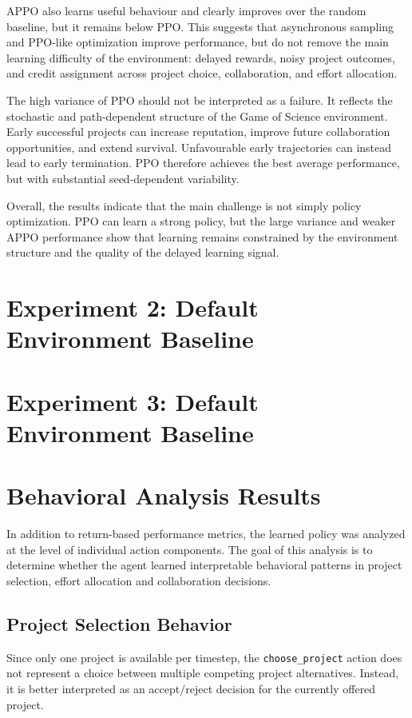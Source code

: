 \documentclass[english,bachelor]{hsluthesis}
\begin{document}
APPO also learns useful behaviour and clearly improves over the random baseline, but it remains below PPO. This suggests that asynchronous sampling and PPO-like optimization improve performance, but do not remove the main learning difficulty of the environment: delayed rewards, noisy project outcomes, and credit assignment across project choice, collaboration, and effort allocation.

The high variance of PPO should not be interpreted as a failure. It reflects the stochastic and path-dependent structure of the Game of Science environment. Early successful projects can increase reputation, improve future collaboration opportunities, and extend survival. Unfavourable early trajectories can instead lead to early termination. PPO therefore achieves the best average performance, but with substantial seed-dependent variability.

Overall, the results indicate that the main challenge is not simply policy optimization. PPO can learn a strong policy, but the large variance and weaker APPO performance show that learning remains constrained by the environment structure and the quality of the delayed learning signal.

\section{Experiment 2: Default Environment Baseline}

\section{Experiment 3: Default Environment Baseline}

\section{Behavioral Analysis Results}

In addition to return-based performance metrics, the learned policy was analyzed at the level of individual action components. The goal of this analysis is to determine whether the agent learned interpretable behavioral patterns in project selection, effort allocation and collaboration decisions.

\subsection{Project Selection Behavior}

Since only one project is available per timestep, the \texttt{choose\_project} action does not represent a choice between multiple competing project alternatives. Instead, it is better interpreted as an accept/reject decision for the currently offered project.
\end{document}
